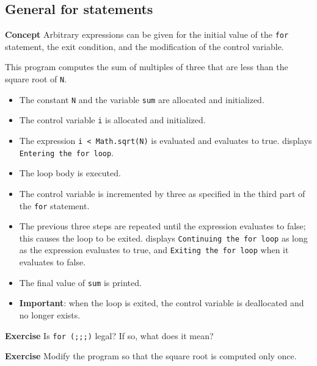 \subsection{General for statements}\label{control.07}

\textbf{Concept} Arbitrary expressions can be given for the initial value of the \texttt{for} statement, the exit condition, and the modification of the control variable.


This program computes the sum of multiples of three that are less
than the square root of \texttt{N}.

\begin{itemize}
\item The constant \texttt{N} and the variable \texttt{sum} are allocated and initialized.
\item The control variable \texttt{i} is allocated and initialized.
\item The expression \texttt{i < Math.sqrt(N)} is evaluated and evaluates to true.
\jel{} displays \texttt{Entering the for loop}.
\item The loop body is executed. 
\item The control variable is incremented by three as specified in the third part of the
\texttt{for} statement.
\item The previous three steps are repeated until the expression evaluates to false;
this causes the loop to be exited. \jel{} displays \texttt{Continuing the for loop}
as long as the expression evaluates to true, and \texttt{Exiting the for loop} when
it evaluates to false.
\item The final value of \texttt{sum} is printed. 
\item \textbf{Important}: when the loop is exited, the control variable is
deallocated and no longer exists.
\end{itemize}

\textbf{Exercise} Is \texttt{for (;;;)} legal? If so, what does it mean?

\textbf{Exercise} Modify the program so that the square root is computed only once.
